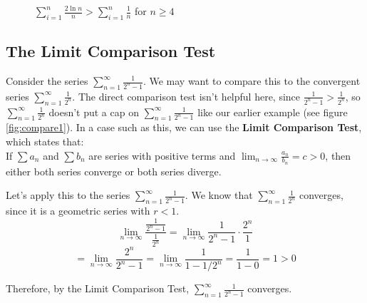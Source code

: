 \begin{figure}
    \centering
    \caption{$\sum_{i=1}^n \frac{2\ln{n}}{n} > \sum_{i=1}^n \frac{1}{n}$ 
    for $n \geq 4$}
    \label{fig:compare2}
\end{figure}

\subsection{The Limit Comparison Test}
Consider the series $\sum_{n=1}^\infty 
\frac{1}{2^n - 1}$. We may want to compare this to the convergent series $\sum_
{n=1}^\infty \frac{1}{2^n}$. The direct comparison test isn't helpful here, 
since $\frac{1}{2^n - 1} > \frac{1}{2^n}$, so $\sum_{n=1}^\infty \frac{1}{2^n}$ 
doesn't put a cap on $\sum_{n=1}^\infty \frac{1}{2^n - 1}$ like our earlier 
example (see figure \ref{fig:compare1}). In a case such as this, we can use 
the \textbf{Limit Comparison Test}, which states that:\\
If $\sum a_n$ and $\sum b_n$ are series with positive terms and $\lim_{n \to 
\infty} \frac{a_n}{b_n} = c > 0$, then either both series converge or both 
series diverge.

Let's apply this to the series $\sum_{n=1}^\infty \frac{1}{2^n - 1}$. We know 
that $\sum_{n=1}^\infty \frac{1}{2^n}$ converges, since it is a geometric 
series with $r < 1$. 
$$\lim_{n \to \infty} \frac{\frac{1}{2^n - 1}}{\frac{1}{2^n}} = \lim_{n \to 
\infty} \frac{1}{2^n - 1} \cdot \frac{2^n}{1}$$
$$= \lim_{n \to \infty} \frac{2^n}{2^n - 1} = \lim_{n \to \infty} \frac{1}{1 - 
1/2^n} = \frac{1}{1-0} = 1 > 0$$

Therefore, by the Limit Comparison Test, $\sum_{n=1}^\infty \frac{1}{2^n - 1}$ 
converges.

